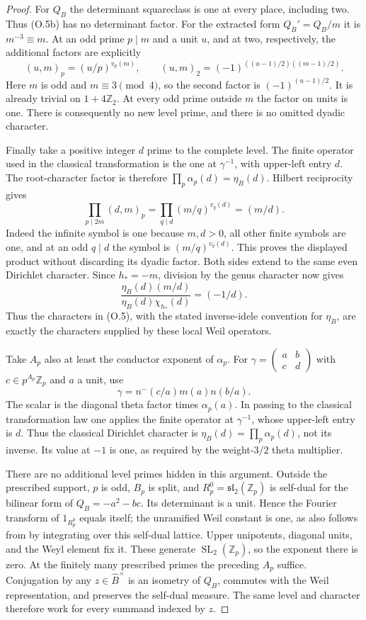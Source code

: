 \begin{proof}
For $Q_B$ the determinant squareclass is one at every place,
including two. Thus (O.5b) has no determinant factor. For the
extracted form $Q_B'=Q_B/m$ it is $m^{-3}\equiv m$.
At an odd prime $p\mid m$ and a unit $u$, and at two, respectively,
the additional factors are explicitly
\[
 (u,m)_p=(u/p)^{v_p(m)},\qquad
 (u,m)_2=(-1)^{((u-1)/2)((m-1)/2)}.
\]
Here $m$ is odd and $m\equiv3\pmod4$, so the second factor is
$(-1)^{(u-1)/2}$. It is already trivial on $1+4\mathbb Z_2$.
At every odd prime outside $m$ the factor on units is one. There
is consequently no new level prime, and there is no omitted
dyadic character.

Finally take a positive integer $d$ prime to the complete level.
The finite operator used in the classical transformation is the
one at $\gamma^{-1}$, with upper-left entry $d$. The root-character
factor is therefore $\prod_p\alpha_p(d)=\eta_B(d)$.
Hilbert reciprocity gives
\[
 \prod_{p\mid 2m}(d,m)_p
   =\prod_{q\mid d}(m/q)^{v_q(d)}=(m/d).                       \tag{O.5c}
\]
Indeed the infinite symbol is one because $m,d>0$, all other
finite symbols are one, and at an odd $q\mid d$ the symbol is
$(m/q)^{v_q(d)}$. This proves the displayed product without
discarding its dyadic factor. Both sides extend to the same
even Dirichlet character. Since $h_*=-m$, division by the genus
character now gives
\[
 \frac{\eta_B(d)(m/d)}{\eta_B(d)\chi_{h_*}(d)}=(-1/d).
\]
Thus the characters in (O.5), with the stated inverse-idele
convention for $\eta_B$, are exactly the characters supplied
by these local Weil operators.

Take $A_p$ also at least the conductor exponent of $\alpha_p$.
For $\gamma=\left(\begin{smallmatrix}a&b\\c&d\end{smallmatrix}\right)$
with $c\in p^{A_p}\mathbb Z_p$ and $a$ a unit, use
\[
 \gamma=n^-(c/a)m(a)n(b/a).
\]
The scalar is the diagonal theta factor times $\alpha_p(a)$.
In passing to the classical transformation law one applies the
finite operator at $\gamma^{-1}$, whose upper-left entry is $d$.
Thus the classical Dirichlet character is
$\eta_B(d)=\prod_p\alpha_p(d)$, not its inverse.  Its value at
$-1$ is one, as required by the weight-$3/2$ theta multiplier.

There are no additional level primes hidden in this argument.
Outside the prescribed support, $p$ is odd, $B_p$ is split, and
$R_p^0=\mathfrak{sl}_2(\mathbb Z_p)$ is self-dual for the bilinear
form of $Q_B=-a^2-bc$.  Its determinant is a unit.  Hence the
Fourier transform of $1_{R_p^0}$ equals itself; the unramified
Weil constant is one, as also follows from \cite[II.27]{weil} by integrating
over this self-dual lattice.  Upper unipotents, diagonal units,
and the Weyl element fix it.  These generate
$\operatorname{SL}_2(\mathbb Z_p)$, so the exponent there is zero.
At the finitely many prescribed primes the preceding $A_p$ suffice.
Conjugation by any $z\in\widehat B^\times$ is an isometry of $Q_B$,
commutes with the Weil representation, and preserves the
self-dual measure.  The same level and character therefore work
for every summand indexed by $z$.


\end{proof}
